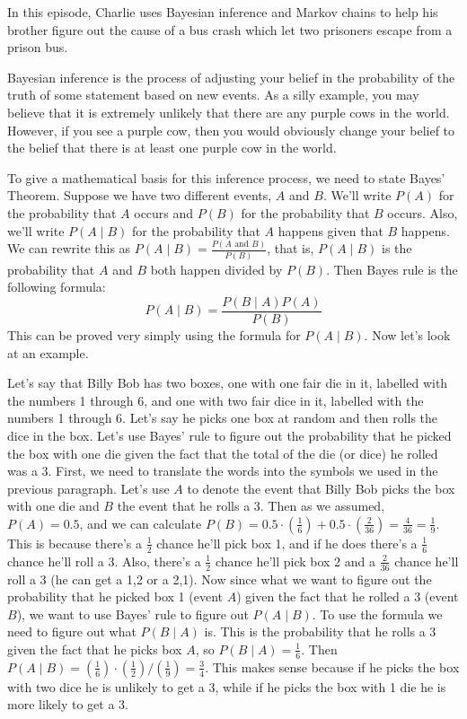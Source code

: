 \newpage
{}
{}
\setcounter{activity}{0}

In this episode, Charlie uses Bayesian inference and Markov chains to help his brother figure out the cause of a bus crash which let two prisoners escape from a prison bus.




Bayesian inference is the process of adjusting your belief in the probability of the truth of some statement based on new events. As a silly example, you may believe that it is extremely unlikely that there are any purple cows in the world. However, if you see a purple cow, then you would obviously change your belief to the belief that there is at least one purple cow in the world.


To give a mathematical basis for this inference process, we need to state Bayes' Theorem. Suppose we have two different events, $A$ and $B$. We'll write $P(A)$ for the probability that $A$ occurs and $P(B)$ for the probability that $B$ occurs. Also, we'll write $P(A \mid B)$ for the probability that $A$ happens given that $B$ happens. We can rewrite this as $P(A \mid B)=\frac{P(A \text{ and }B)}{P(B)}$, that is, $P(A \mid B)$ is the probability that $A$ and $B$ both happen divided by $P(B)$. Then Bayes rule is the following formula:
	\[
	P(A \mid B) = \frac{P(B \mid A) P(A)}{P(B)}
	\]
This can be proved very simply using the formula for $P(A \mid B)$. Now let's look at an example.


Let's say that Billy Bob has two boxes, one with one fair die in it, labelled with the numbers 1 through 6, and one with two fair dice in it, labelled with the numbers 1 through 6. Let's say he picks one box at random and then rolls the dice in the box. Let's use Bayes' rule to figure out the probability that he picked the box with one die given the fact that the total of the die (or dice) he rolled was a 3. First, we need to translate the words into the symbols we used in the previous paragraph. Let's use $A$ to denote the event that Billy Bob picks the box with one die and $B$ the event that he rolls a 3. Then as we assumed, $P(A) = 0.5$, and we can calculate $P(B)=0.5\cdot \left( \frac{1}{6} \right) + 0.5 \cdot \left( \frac{2}{36} \right) = \frac{4}{36} =  \frac{1}{9}$. This is because there's a $\frac{1}{2}$ chance he'll pick box 1, and if he does there's a $\frac{1}{6}$ chance he'll roll a 3. Also, there's a $\frac{1}{2}$ chance he'll pick box 2 and a $\frac{2}{36}$ chance he'll roll a 3 (he can get a 1,2 or a 2,1). Now since what we want to figure out the probability that he picked box 1 (event $A$) given the fact that he rolled a 3 (event $B$), we want to use Bayes' rule to figure out $P(A \mid B)$. To use the formula we need to figure out what $P(B \mid A)$ is. This is the probability that he rolls a 3 given the fact that he picks box $A$, so $P(B\mid A)=\frac{1}{6}$. Then $P(A \mid B)= \left( \frac{1}{6} \right) \cdot \left( \frac{1}{2} \right)/ \left( \frac{1}{9} \right)=  \frac{3}{4}$. This makes sense because if he picks the box with two dice he is unlikely to get a 3, while if he picks the box with 1 die he is more likely to get a 3.


